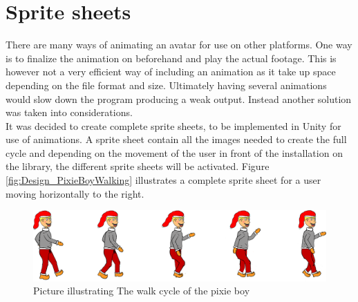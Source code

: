 \section{Sprite sheets}
There are many ways of animating an avatar for use on other platforms. One way is to finalize the animation on beforehand and play the actual footage. This is however not a very efficient way of including an animation as it take up space depending on the file format and size. Ultimately having several animations would slow down the program producing a weak output. Instead another solution was taken into considerations.\\
It was decided to create complete sprite sheets, to be implemented in Unity for use of animations. A sprite sheet contain all the images needed to create the full cycle and depending on the movement of the user in front of the installation on the library, the different sprite sheets will be activated. Figure \eqref{fig:Design_PixieBoyWalking} illustrates a complete sprite sheet for a user moving horizontally to the right.
\begin{figure}[htbp]
\centering
\includegraphics[width=1.00\textwidth]{Pictures/Design/PixieWalking.png}
\caption{Picture illustrating The walk cycle of the pixie boy}
\label{fig:Design_PixieBoyWalking}
\end{figure}





